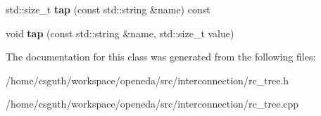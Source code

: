 \begin{DoxyCompactItemize}
\item 
\hypertarget{classophidian_1_1interconnection_1_1packed__rc__tree_a91977580aecd868e866d6a618ecd96d2}{std\-::size\-\_\-t {\bfseries tap} (const std\-::string \&name) const }\label{classophidian_1_1interconnection_1_1packed__rc__tree_a91977580aecd868e866d6a618ecd96d2}

\item 
\hypertarget{classophidian_1_1interconnection_1_1packed__rc__tree_afd840cb2fba0ab4d614efb19c6bfc271}{void {\bfseries tap} (const std\-::string \&name, std\-::size\-\_\-t value)}\label{classophidian_1_1interconnection_1_1packed__rc__tree_afd840cb2fba0ab4d614efb19c6bfc271}

\end{DoxyCompactItemize}


The documentation for this class was generated from the following files\-:\begin{DoxyCompactItemize}
\item 
/home/csguth/workspace/openeda/src/interconnection/rc\-\_\-tree.\-h\item 
/home/csguth/workspace/openeda/src/interconnection/rc\-\_\-tree.\-cpp\end{DoxyCompactItemize}
